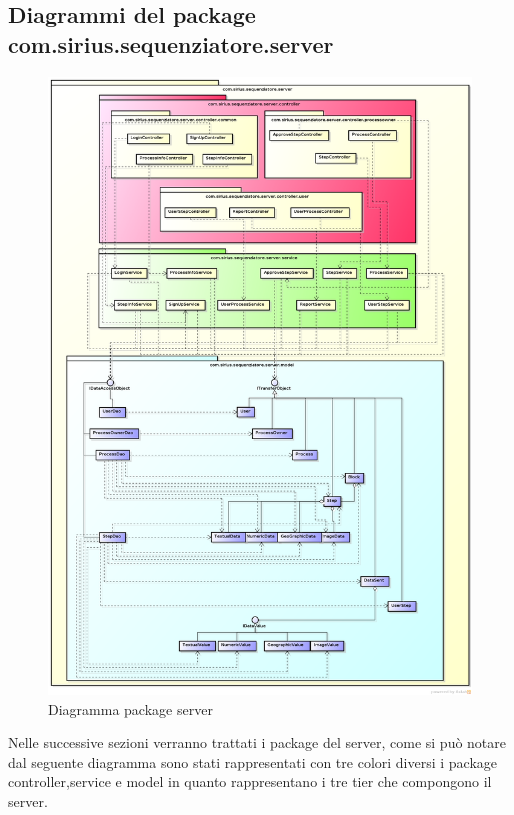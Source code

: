 \subsection{Diagrammi del package com.sirius.sequenziatore.server}
\begin{figure}[H] \centering \includegraphics[width=%
\textwidth]
{./pack/server.png} \caption{Diagramma package server}
\end{figure}
Nelle successive sezioni verranno trattati i package del server, come si può notare dal seguente diagramma sono stati rappresentati con tre colori diversi i package controller,service e model in quanto rappresentano i tre tier che compongono il server.
